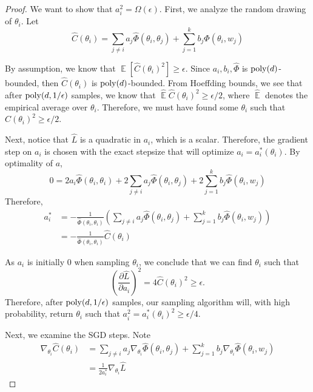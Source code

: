 \documentclass{article}
\DeclareMathOperator*{\expt}{\mathbb{E}}
\newcommand{\pd}[2]{\frac{\partial#1}{\partial#2}}
\begin{document}
\begin{proof}
We want to show that $a_i^2 = \Omega(\epsilon)$. First, we analyze the random drawing of $\theta_i$.  Let 
%
\[  \widehat{C}(\theta_i) = \sum_{j\neq i} a_j \widehat{\Phi}(\theta_i,\theta_j) + \sum_{j=1}^k b_j \widehat{\Phi}(\theta_i,w_j)\]
%

By assumption, we know that $\expt[\widehat{C}(\theta_i)^2] \geq
\epsilon$. Since $a_i,b_i, \widehat{\Phi}$ is $\mathrm{poly}(d)$-bounded, then $\widehat{C}(\theta_i)$ is $\mathrm{poly}(d)$-bounded. From Hoeffding bounds, we see that after $\mathrm{poly}(d,1/\epsilon)$ samples, we know that $\hat{\expt}\widehat{C}(\theta_i)^2 \geq \epsilon/2$, where $\hat{\expt}$ denotes the empirical average over $\theta_i$. Therefore, we must have found some $\theta_i$ such that $\widehat{C}(\theta_i)^2 \geq \epsilon/2$.

Next, notice that $\hat{L}$ is a quadratic in $a_i$, which is a
scalar. Therefore, the gradient step on $a_i$ is chosen with the exact
stepsize that will optimize $a_i = a_i^*(\theta_i)$.  By optimality of
$a$,
%
\begin{equation}
0 = 2a_i \widehat{\Phi}(\theta_i,\theta_i) + 2\sum_{j\neq i} a_j \widehat{\Phi}(\theta_i,\theta_j) + 2\sum_{j=1}^k b_j \widehat{\Phi}(\theta_i,w_j)
\end{equation} 
%
Therefore, 
%
\begin{align*}
 a_i^* & = - \frac{1}{\widehat{\Phi}(\theta_i,\theta_i)} (\sum_{j\neq i} a_j \widehat{\Phi}(\theta_i,\theta_j) + \sum_{j=1}^k b_j \widehat{\Phi}(\theta_i,w_j)) \\
& = -\frac{1}{\widehat{\Phi}(\theta_i,\theta_i)}\widehat{C}(\theta_i) 
\end{align*}


As $a_i$ is initially $0$ when sampling $\theta_i$, we conclude that we can find $\theta_i$ such that
%
\[ \left( \pd{\hat{L}}{a_i} \right)^2 = 4 \widehat{C}(\theta_i)^2 \geq \epsilon.\]
Therefore, after $\mathrm{poly}(d,1/\epsilon)$ samples, our sampling algorithm will, with high probability, return $\theta_i$  such that $a_i^2 = a_i^*(\theta_i)^2 \geq \epsilon /4$. 

Next, we examine the SGD steps. Note
%
\begin{align*}
\nabla_{\theta_i} \widehat{C}(\theta_i) & =  \sum_{j\neq i} a_j \nabla_{\theta_i}\widehat{\Phi}(\theta_i,\theta_j) + \sum_{j=1}^k b_j \nabla_{\theta_i}\widehat{\Phi}(\theta_i,w_j) \\
& = \frac{1}{2a_i^*} \nabla_{\theta_i}\widehat{L}
\end{align*}


\end{proof}
\end{document}

